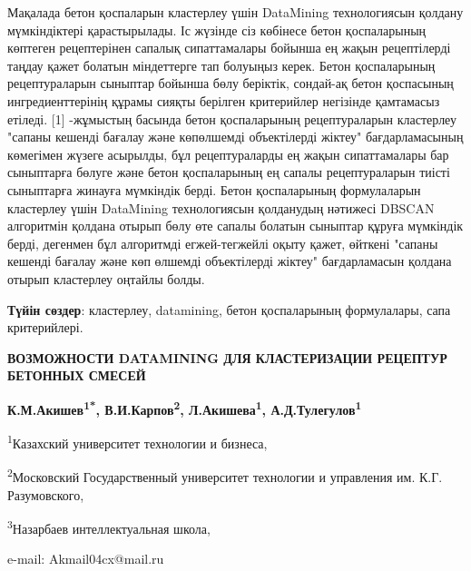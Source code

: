 Мақалада бетон қоспаларын кластерлеу үшін DataMining технологиясын
қолдану мүмкіндіктері қарастырылады. Іс жүзінде сіз көбінесе бетон
қоспаларының көптеген рецептерінен сапалық сипаттамалары бойынша ең
жақын рецептілерді таңдау қажет болатын міндеттерге тап болуыңыз керек.
Бетон қоспаларының рецептураларын сыныптар бойынша бөлу беріктік,
сондай-ақ бетон қоспасының ингредиенттерінің құрамы сияқты берілген
критерийлер негізінде қамтамасыз етіледі. {[}1{]} -жұмыстың басында
бетон қоспаларының рецептураларын кластерлеу "сапаны кешенді бағалау
және көпөлшемді объектілерді жіктеу" бағдарламасының көмегімен жүзеге
асырылды, бұл рецептураларды ең жақын сипаттамалары бар сыныптарға
бөлуге және бетон қоспаларының ең сапалы рецептураларын тиісті
сыныптарға жинауға мүмкіндік берді. Бетон қоспаларының формулаларын
кластерлеу үшін DataMining технологиясын қолданудың нәтижесі DBSCAN
алгоритмін қолдана отырып бөлу өте сапалы болатын сыныптар құруға
мүмкіндік берді, дегенмен бұл алгоритмді егжей-тегжейлі оқыту қажет,
өйткені "сапаны кешенді бағалау және көп өлшемді объектілерді жіктеу"
бағдарламасын қолдана отырып кластерлеу оңтайлы болды.

{\bfseries Түйін сөздер}: кластерлеу, datamining, бетон қоспаларының
формулалары, сапа критерийлері.

\newpage
\begin{center}
{\large\bfseries ВОЗМОЖНОСТИ DATAMINING ДЛЯ КЛАСТЕРИЗАЦИИ РЕЦЕПТУР БЕТОННЫХ
СМЕСЕЙ}

\vspace{1em}
{\bfseries К.М.Акишев\textsuperscript{1*}, В.И.Карпов\textsuperscript{2},
Л.Акишева\textsuperscript{1}, А.Д.Тулегулов\textsuperscript{1}}

\textsuperscript{1}Казахский университет технологии и бизнеса,

\textsuperscript{2}Московский Государственный университет
технологии и управления им. К.Г. Разумовского,

\textsuperscript{3}Назарбаев интеллектуальная школа,

e-mail: Akmail04cx@mail.ru
\end{center}

